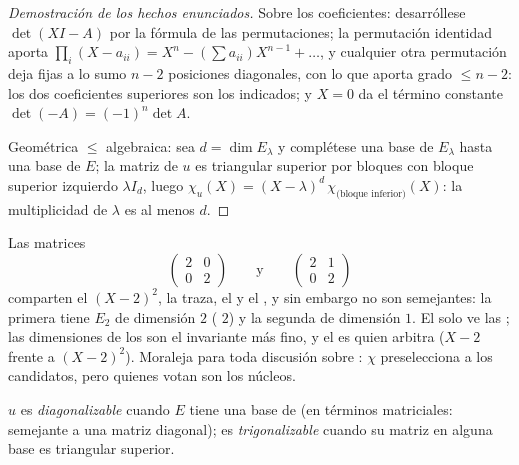 \begin{proof}[Demostración de los hechos enunciados]
Sobre los coeficientes: desarróllese $\det(XI - A)$ por la fórmula de
las permutaciones; la permutación identidad aporta $\prod_i (X -
a_{ii}) = X^n - (\sum a_{ii})X^{n-1} + \dots$, y cualquier otra
permutación deja fijas a lo sumo $n - 2$ posiciones diagonales, con
lo que aporta grado $\leq n - 2$: los dos coeficientes superiores son
los indicados; y $X = 0$ da el término constante $\det(-A) =
(-1)^n\det A$.

Geométrica $\leq$ algebraica: sea $d = \dim E_\lambda$ y complétese
una base de $E_\lambda$ hasta una base de $E$; la matriz de $u$ es
triangular superior por bloques con bloque superior izquierdo
$\lambda I_d$, luego $\chi_u(X) = (X -
\lambda)^d\, \chi_{\text{(bloque inferior)}}(X)$: la multiplicidad de
$\lambda$ es al menos $d$.
\end{proof}

\begin{example}\label{ex:b2:reduction:samechi}
Las matrices
\[
\begin{pmatrix}2 & 0\\ 0 & 2\end{pmatrix}
\qquad\text{y}\qquad
\begin{pmatrix}2 & 1\\ 0 & 2\end{pmatrix}
\]
comparten el  $(X - 2)^2$, la traza, el
 y el , y sin embargo no son semejantes: la
primera tiene $E_2$ de dimensión $2$ (
$2$) y la segunda de dimensión $1$. El 
solo ve las ; las dimensiones de los
 son el invariante más fino, y el
 es quien arbitra ($X - 2$ frente a $(X - 2)^2$).
Moraleja para toda discusión sobre : $\chi$
preselecciona a los candidatos, pero quienes votan son los núcleos.
\end{example}

\begin{definition}\label{def:b2:reduction:diag}
$u$ es \emph{diagonalizable} cuando $E$ tiene
una base de  (en términos matriciales: semejante a
una matriz diagonal); es \emph{trigonalizable}
cuando su matriz en alguna base es triangular superior.
\end{definition}

